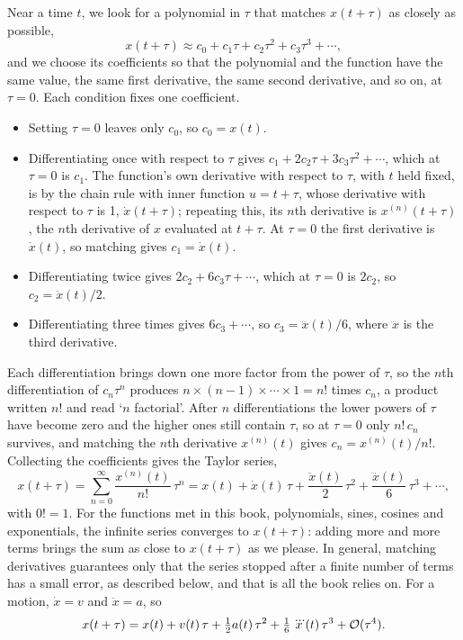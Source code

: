 Near a time $t$, we look for a polynomial in $\tau$ that matches $x(t +
\tau)$ as closely as possible,
\begin{equation*}
   x(t+\tau) \approx c_0 + c_1\tau + c_2\tau^2 + c_3\tau^3 + \dotsb ,
\end{equation*}
and we choose its coefficients so that the polynomial and the function
have the same value, the same first derivative, the same second
derivative, and so on, at $\tau = 0$. Each condition fixes one
coefficient.
\begin{itemize}
\item Setting $\tau = 0$ leaves only $c_0$, so $c_0 = x(t)$.
\item Differentiating once with respect to $\tau$ gives $c_1 + 2c_2\tau +
   3c_3\tau^2 + \dotsb$, which at $\tau = 0$ is $c_1$. The function's own
   derivative with respect to $\tau$, with $t$ held fixed, is by the chain
   rule with inner function $u = t + \tau$, whose derivative with respect
   to $\tau$ is 1, $\dot{x}(t+\tau)$; repeating this, its $n$th derivative
   is $x^{(n)}(t+\tau)$, the $n$th derivative of $x$ evaluated at
   $t+\tau$. At $\tau = 0$ the first derivative is $\dot{x}(t)$, so matching
   gives $c_1 = \dot{x}(t)$.
\item Differentiating twice gives $2c_2 + 6c_3\tau + \dotsb$, which at
   $\tau = 0$ is $2c_2$, so $c_2 = \ddot{x}(t)/2$.
\item Differentiating three times gives $6c_3 + \dotsb$, so $c_3 =
   \dddot{x}(t)/6$, where $\dddot{x}$ is the third derivative.
\end{itemize}
Each differentiation brings down one more factor from the power of
$\tau$, so the $n$th differentiation of $c_n\tau^n$ produces $n\times(n-1)
\times\dotsb\times 1 = n!$ times $c_n$, a product written $n!$ and read
`$n$ factorial'. After $n$ differentiations the lower powers of $\tau$ have
become zero and the higher ones still contain $\tau$, so at $\tau = 0$ only
$n!\,c_n$ survives, and matching the $n$th derivative $x^{(n)}(t)$ gives
$c_n = x^{(n)}(t)/n!$. Collecting the coefficients gives the Taylor
series,
\begin{equation*}
   x(t+\tau) = \sum_{n=0}^{\infty} \frac{x^{(n)}(t)}{n!}\,\tau^n
   = x(t) + \dot{x}(t)\,\tau + \frac{\ddot{x}(t)}{2}\,\tau^2
   + \frac{\dddot{x}(t)}{6}\,\tau^3 + \dotsb ,
\end{equation*}
with $0! = 1$. For the functions met in this book, polynomials, sines,
cosines and exponentials, the infinite series converges to $x(t+\tau)$:
adding more and more terms brings the sum as close to $x(t+\tau)$ as we
please.
In general, matching derivatives guarantees only that the series stopped
after a finite number of terms has a small error, as described below, and
that is all the book relies on. For a motion, $\dot{x} = v$ and $\ddot{x}
= a$, so
\begin{equation}
   x(t+\tau) = x(t) + v(t)\,\tau + \tfrac12 a(t)\,\tau^2
   + \tfrac16\,\dddot{x}(t)\,\tau^3 + \mathcal{O}(\tau^4) .
   \label{eq:mo-taylor}
\end{equation}

